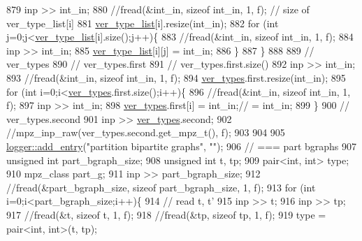 \begin{DoxyCode}
879     inp >> int\_in;
880     \textcolor{comment}{//fread(&int\_in, sizeof int\_in, 1, f); // size of ver\_type\_list[i]}
881     \hyperlink{classmarked__graph__compressed_af2e3e55223d436628a02758dfae88493}{ver\_type\_list}[i].resize(int\_in);
882     \textcolor{keywordflow}{for} (\textcolor{keywordtype}{int} j=0;j<\hyperlink{classmarked__graph__compressed_af2e3e55223d436628a02758dfae88493}{ver\_type\_list}[i].size();j++)\{
883       \textcolor{comment}{//fread(&int\_in, sizeof int\_in, 1, f);}
884       inp >> int\_in;
885       \hyperlink{classmarked__graph__compressed_af2e3e55223d436628a02758dfae88493}{ver\_type\_list}[i][j] = int\_in;
886     \}
887   \}
888 
889   \textcolor{comment}{// ver\_types}
890   \textcolor{comment}{// ver\_types.first}
891   \textcolor{comment}{// ver\_types.first.size()}
892   inp >> int\_in;
893   \textcolor{comment}{//fread(&int\_in, sizeof int\_in, 1, f);}
894   \hyperlink{classmarked__graph__compressed_af446cc5e23c241a92b76642fd5ebc403}{ver\_types}.first.resize(int\_in);
895   \textcolor{keywordflow}{for} (\textcolor{keywordtype}{int} i=0;i<\hyperlink{classmarked__graph__compressed_af446cc5e23c241a92b76642fd5ebc403}{ver\_types}.first.size();i++)\{
896     \textcolor{comment}{//fread(&int\_in, sizeof int\_in, 1, f);}
897     inp >> int\_in;
898     \hyperlink{classmarked__graph__compressed_af446cc5e23c241a92b76642fd5ebc403}{ver\_types}.first[i] = int\_in;\textcolor{comment}{// = int\_in;}
899   \}
900   \textcolor{comment}{// ver\_types.second}
901   inp >> \hyperlink{classmarked__graph__compressed_af446cc5e23c241a92b76642fd5ebc403}{ver\_types}.second;
902   \textcolor{comment}{//mpz\_inp\_raw(ver\_types.second.get\_mpz\_t(), f);}
903 
904 
905   \hyperlink{classlogger_a710163deb17bc81f70d53d285b8ac9ac}{logger::add\_entry}(\textcolor{stringliteral}{"partition bipartite graphs"}, \textcolor{stringliteral}{""});
906   \textcolor{comment}{// === part bgraphs}
907   \textcolor{keywordtype}{unsigned} \textcolor{keywordtype}{int} part\_bgraph\_size;
908   \textcolor{keywordtype}{unsigned} \textcolor{keywordtype}{int} t, tp;
909   pair<int, int> type; 
910   mpz\_class part\_g;
911   inp >> part\_bgraph\_size;
912   \textcolor{comment}{//fread(&part\_bgraph\_size, sizeof part\_bgraph\_size, 1, f);}
913   \textcolor{keywordflow}{for} (\textcolor{keywordtype}{int} i=0;i<part\_bgraph\_size;i++)\{
914     \textcolor{comment}{// read t, t'}
915     inp >> t;
916     inp >> tp;
917     \textcolor{comment}{//fread(&t, sizeof t, 1, f);}
918     \textcolor{comment}{//fread(&tp, sizeof tp, 1, f);}
919     type = pair<int, int>(t, tp);

\end{DoxyCode}
